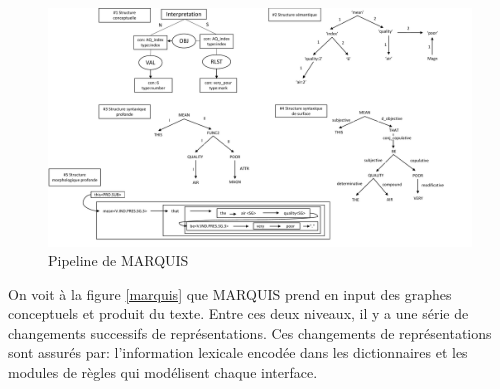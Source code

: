\begin{figure}[htb]
	\centering
	\includegraphics[width=1\textwidth, trim = {0cm 0cm 0cm 0cm},clip]{ch2/figs/marquis.pdf}
	\caption{Pipeline de MARQUIS}
	\label{fig:marquis}
\end{figure}

On voit à la figure \ref{marquis} que MARQUIS prend en input des graphes conceptuels et produit du texte. Entre ces deux niveaux, il y a une série de changements successifs de représentations. Ces changements de représentations sont assurés par: l'information lexicale encodée dans les dictionnaires et les modules de règles qui modélisent chaque interface. 

